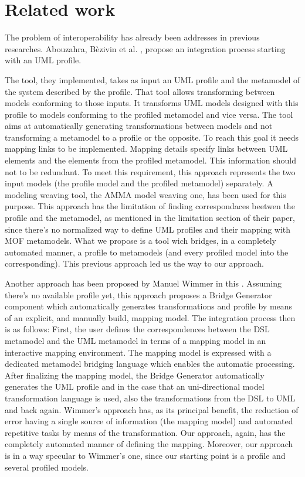 \section{Related work}\label{sec:related}

The problem of interoperability has already been addresses in previous researches. Abouzahra, B\`ezivin et al. \cite{Abouzahra}, propose an integration process starting with an UML profile. 

The tool, they implemented, takes as input an UML profile and the metamodel of the system described by the profile. That tool allows
transforming between models conforming to those inputs. It transforms UML models designed with this profile to models conforming to the profiled metamodel and vice versa. The tool aims at automatically generating transformations between models and not transforming a metamodel to a profile or the opposite. To reach this goal it needs mapping links to be implemented. Mapping details specify links between UML elements and the elements from the profiled metamodel. This information should not to be redundant. To meet this requirement, this approach represents the two input models (the profile model and the profiled metamodel) separately. A modeling weaving tool, the AMMA model weaving one, has been used for this purpose. This approach has the limitation of finding correspondaces beetwen the profile and the metamodel, as mentioned in the limitation section of their paper, since there's no normalized way to define UML profiles and their mapping with MOF metamodels. What we propose is a tool wich bridges, in a completely automated manner, a profile to metamodels (and every profiled model into the corresponding). This previous approach led us the way to our approach.


Another approach has been proposed by Manuel Wimmer in this \cite{Wimmer}. Assuming there's no available profile yet, this approach proposes a Bridge Generator component which automatically generates transformations and profile by means of an explicit, and manually build, mapping model. The integration process then is as follows: First, the user defines the correspondences between the DSL metamodel and the UML metamodel in terms of a mapping model in an interactive mapping environment. The mapping model is expressed with a dedicated metamodel bridging language which enables the automatic processing. After finalizing the mapping model, the Bridge Generator automatically generates the UML profile and in the case that an uni-directional model transformation language is used, also the transformations from the DSL to UML and back again. Wimmer's approach has, as its principal benefit, the reduction of error having a single source of information (the mapping model) and automated repetitive tasks by means of the transformation. Our approach, again, has the completely automated manner of defining the mapping. Moreover, our approach is in a way specular to Wimmer's one, since our starting point is a profile and several profiled models.


